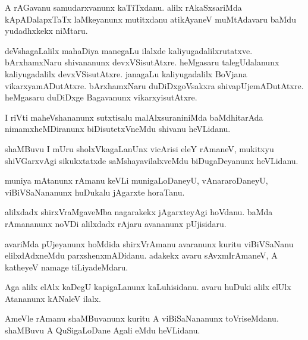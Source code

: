 \documentclass{article}
\begin{document}
\begin{mn}
A  rAGavanu  samudarxvanunx  kaTiTxdanu.  alilx  rAkaSxsariMda  kApADalapxTaTx  laMkeyanunx  mutitxdanu  atikAyaneV  
muMtAdavaru  baMdu  yudadhxkekx  niMtaru.
\end{mn}

\begin{mn}
deVshagaLalilx  mahaDiya  manegaLu  ilalxde  kaliyugadalilxrutatxve.  bArxhamxNaru  shivananunx  devxVSisutAtxre.  
heMgasaru  talegUdalanunx  kaliyugadalilx  devxVSisutAtxre.  janagaLu  kaliyugadalilx  BoVjana  vikarxyamADutAtxre.  
bArxhamxNaru  duDiDxgoVsakxra  shivapUjemADutAtxre.  heMgasaru  duDiDxge  Bagavanunx  vikarxyisutAtxre.
\end{mn}

\begin{mn}
I riVti  maheVshananunx  sutxtisalu  malAlxsuraniniMda  baMdhitarAda  nimamxheMDiranunx  biDisutetxVneMdu  shivanu  heVLidanu.
\end{mn}

\begin{mn}
shaMBuvu  I  mUru  sholxVkagaLanUnx  vicArisi  eleY  rAmaneV,  mukitxyu  shiVGarxvAgi  sikukxtatxde  saMshayavilalxveMdu  
biDugaDeyanunx  heVLidanu.
\end{mn}

\begin{mn}
muniya  mAtanunx  rAmanu  keVLi  munigaLoDaneyU,  vAnararoDaneyU,  viBiVSaNananunx  huDukalu  jAgarxte  horaTanu.
\end{mn}

\begin{mn}
alilxdadx  shirxVraMgaveMba  nagarakekx  jAgarxteyAgi  hoVdanu.  baMda  rAmananunx  noVDi  alilxdadx  rAjaru  avananunx  pUjisidaru.
\end{mn}

\begin{mn}
avariMda  pUjeyanunx  hoMdida  shirxVrAmanu  avaranunx  kuritu  viBiVSaNanu  elilxdAdxneMdu  parxshenxmADidanu.  adakekx  avaru  
sAvxmIrAmaneV,  A  katheyeV  namage  tiLiyadeMdaru.
\end{mn}

\begin{mn}
Aga  alilx  elAlx  kaDegU  kapigaLanunx  kaLuhisidanu.  avaru  huDuki  alilx  elUlx  Atananunx  kANaleV  ilalx.
\end{mn}

\begin{mn}
AmeVle  rAmanu  shaMBuvanunx  kuritu  A  viBiSaNananunx  toVriseMdanu.  shaMBuvu  A  QuSigaLoDane  Agali  eMdu  heVLidanu.
\end{mn}
\end{document}

